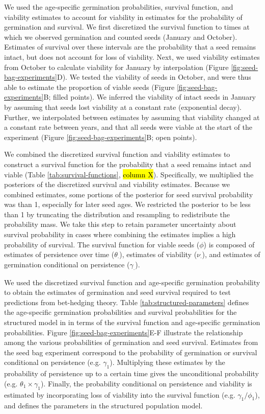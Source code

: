 \documentclass[12pt, oneside, titlepage]{article}   	%
\begin{document}
{We used the age-specific germination probabilities, survival function, and viability estimates to account for viability in estimates for the probability of germination and survival. We first discretized the survival function to times at which we observed germination and counted seeds (January and October). Estimates of survival over these intervals are the probability that a seed remains intact, but does not account for loss of viability. Next, we used viability estimates from October to calculate viability for January by interpolation (Figure \ref{fig:seed-bag-experiments}D). We tested the viability of seeds in October, and were thus able to estimate the proportion of viable seeds (Figure \ref{fig:seed-bag-experiments}B; filled points). We inferred the viability of intact seeds in January by assuming that seeds lost viability at a constant rate (exponential decay). Further, we interpolated between estimates by assuming that viability changed at a constant rate between years, and that all seeds were viable at the start of the experiment (Figure \ref{fig:seed-bag-experiments}B; open points). 

We combined the discretized survival function and viability estimates to construct a survival function for the probability that a seed remains intact and viable (Table \ref{tab:survival-functions}, \hl{column X}). Specifically, we multiplied the posteriors of the discretized survival and viability estimates. Because we combined estimates, some portions of the posterior for seed survival probability was than 1, especially for later seed ages. We restricted the posterior to be less than 1 by truncating the distribution and resampling to redistribute the probability mass. We take this step to retain parameter uncertainty about survival probability in cases where combining the estimates implies a high probability of survival. The survival function for viable seeds ($\phi$) is composed of estimates of persistence over time ($\theta_\cdot$), estimates of viability ($\nu_\cdot$), and estimates of germination conditional on persistence ($\gamma_\cdot$).

We used the discretized survival function and age-specific germination probability to obtain the estimates of germination and seed survival required to test predictions from bet-hedging theory. Table \ref{tab:structured-parameters} defines the age-specific germination probabilities and survival probabilities for the structured model in \cite{eckhart2011} in terms of the survival function and age-specific germination probabilities. Figure \ref{fig:seed-bag-experiments}E-F illustrate the relationship among the various probabilities of germination and seed survival. Estimates from the seed bag experiment correspond to the probability of germination or survival conditional on persistence (e.g. $\gamma_1$). Multiplying these estimates by the probability of persistence up to a certain time gives the unconditional probability (e.g. $\theta_1 \times \gamma_1$). Finally, the probability conditional on persistence and viability is estimated by incorporating loss of viability into the survival function (e.g. $\gamma_1 / \phi_1$), and defines the parameters in the structured population model.

}
\end{document}
